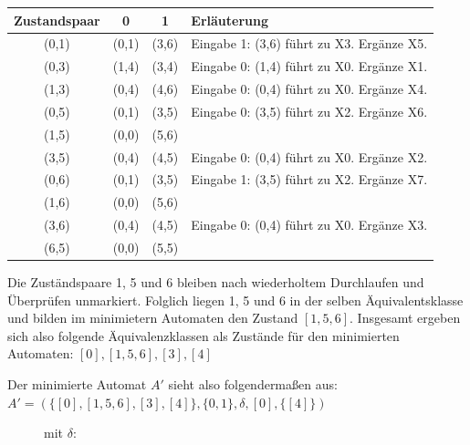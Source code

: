 \begin{teile}
	\begin{tabular}{c|c|c|l}
		\textbf{Zustandspaar} & \textbf{0} & \textbf{1} & \textbf{Erläuterung} \\
		\hline
		(0,1)                 & (0,1)      & (3,6)      & Eingabe 1: (3,6) führt zu X3. Ergänze X5. \\		
		\hline
		(0,3)                 & (1,4)      & (3,4)      & Eingabe 0: (1,4) führt zu X0. Ergänze X1. \\
		\hline
		(1,3)                 & (0,4)      & (4,6)      & Eingabe 0: (0,4) führt zu X0. Ergänze X4. \\
		\hline 		 		
		(0,5)                 & (0,1)      & (3,5)      & Eingabe 0: (3,5) führt zu X2. Ergänze X6. \\
		\hline 		
		(1,5)                 & (0,0)      & (5,6)      & \\
		\hline
		(3,5)                 & (0,4)      & (4,5)      & Eingabe 0: (0,4) führt zu X0. Ergänze X2. \\
		\hline
		(0,6)                 & (0,1)      & (3,5)      & Eingabe 1: (3,5) führt zu X2. Ergänze X7. \\
		\hline
		(1,6)                 & (0,0)      & (5,6)      & \\
		\hline
		(3,6)                 & (0,4)      & (4,5)      & Eingabe 0: (0,4) führt zu X0. Ergänze X3. \\
		\hline
		(6,5)                 & (0,0)      & (5,5)      & \\
	\end{tabular} 
	
	Die Zuständspaare 1, 5 und 6 bleiben nach wiederholtem Durchlaufen und Überprüfen unmarkiert. Folglich liegen 1, 5 und 6 in der selben Äquivalentsklasse und bilden im minimietern Automaten den Zustand $[1,5,6]$. Insgesamt ergeben sich also folgende Äquivalenzklassen als Zustände für den minimierten Automaten: $[0],[1,5,6],[3],[4]$
	
	Der minimierte Automat $A'$ sieht also folgendermaßen aus: \\
	$A' = (\{[0],[1,5,6],[3],[4] \},\{0,1\},\delta, [0], \{[4]\})$

	\begin{figure}[ht]
		\begin{minipage}[t]{.4\textwidth}
			\hspace*{25pt}
			mit $\delta$:


\end{minipage}
\end{figure}
\end{teile}
